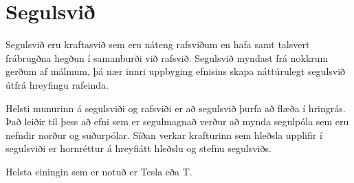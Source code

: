 \chapter{Segulsvið}
Segulsvið eru kraftasvið sem eru náteng rafsviðum en hafa samt talsvert
frábrugðna hegðun í samanburði við rafsvið. Segulsvið myndast frá nokkrum gerðum
af málmum, þá nær innri uppbyging efnisins skapa náttúrulegt segulsvið útfrá
hreyfingu rafeinda.

Helsti munurinn á segulsviði og rafsviði er að segulsvið þurfa að flæða í
hringrás. Það leiðir til þess að efni sem er segulmagnað verður að mynda
segulpóla sem eru nefndir norður og suðurpólar. Síðan verkar krafturinn
sem hleðsla upplifir í segulsviði er hornréttur á hreyfiátt hleðslu og
stefnu segulsviðs.

Helsta einingin sem er notuð er Tesla eða $\si{\tesla}$. 
